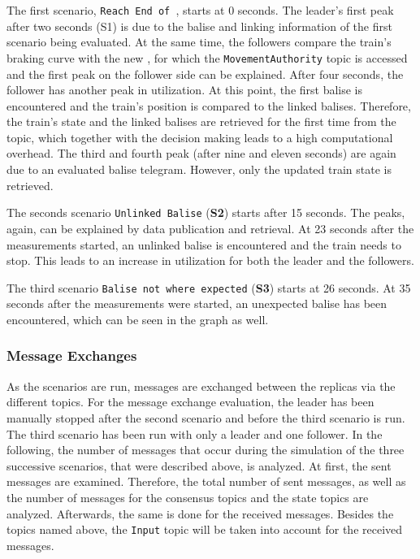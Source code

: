 The first scenario, \texttt{Reach End of }, starts at 0 seconds.
The leader's first peak after two seconds (S1) is due to the balise and linking information of the first scenario being evaluated.
At the same time, the followers compare the train's braking curve with the new , for which the \texttt{MovementAuthority} topic is accessed and the first peak on the follower side can be explained.
After four seconds, the follower has another peak in  utilization.
At this point, the first balise is encountered and the train's position is compared to the linked balises.
Therefore, the train's state and the linked balises are retrieved for the first time from the topic, which together with the decision making leads to a high computational overhead.
The third and fourth peak (after nine and eleven seconds) are again due to an evaluated balise telegram.
However, only the updated train state is retrieved.

The seconds scenario \texttt{Unlinked Balise} (\textbf{S2}) starts after 15 seconds.
The peaks, again, can be explained by data publication and retrieval.
At 23 seconds after the measurements started, an unlinked balise is encountered and the train needs to stop.
This leads to an increase in  utilization for both the leader and the followers.

The third scenario \texttt{Balise not where expected} (\textbf{S3}) starts at 26 seconds.
At 35 seconds after the measurements were started, an unexpected balise has been encountered, which can be seen in the graph as well.

\subsubsection{Message Exchanges}
As the scenarios are run, messages are exchanged between the replicas via the different  topics.
For the message exchange evaluation, the leader has been manually stopped after the second scenario and before the third scenario is run.
The third scenario has been run with only a leader and one follower.
In the following, the number of messages that occur during the simulation of the three successive scenarios, that were described above, is analyzed.
At first, the sent messages are examined.
Therefore, the total number of sent messages, as well as the number of messages for the consensus topics and the state topics are analyzed.
Afterwards, the same is done for the received messages.
Besides the topics named above, the \texttt{Input} topic will be taken into account for the received messages.

